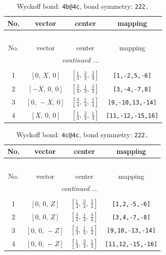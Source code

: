 \documentclass[fleqn,8pt]{jsarticle}
\begin{document}
\begin{longtable}{cccc}
\caption{Wyckoff bond: {\tt 4b@4c}, bond symmetry: {\tt 222.}}
 \\
 \hline \hline
No. & vector & center & mapping \\ \hline \endfirsthead

\multicolumn{3}{l}{\tablename\ \thetable{}} \\
 \hline \hline
No. & vector & center & mapping \\ \hline \endhead

 \hline \hline
\multicolumn{3}{r}{\footnotesize\it continued ...} \\ \endfoot

 \hline \hline
\multicolumn{3}{r}{} \\ \endlastfoot

1 & $\left[ 0,\, X,\, 0 \right]$ & $\left[ \frac{1}{4},\, \frac{3}{4},\, \frac{3}{4} \right]$ & {\tt [1,-2,5,-6]} \\ \hline
2 & $\left[ - X,\, 0,\, 0 \right]$ & $\left[ \frac{3}{4},\, \frac{1}{4},\, \frac{3}{4} \right]$ & {\tt [3,-4,-7,8]} \\ \hline
3 & $\left[ 0,\, - X,\, 0 \right]$ & $\left[ \frac{3}{4},\, \frac{1}{4},\, \frac{1}{4} \right]$ & {\tt [9,-10,13,-14]} \\ \hline
4 & $\left[ X,\, 0,\, 0 \right]$ & $\left[ \frac{1}{4},\, \frac{3}{4},\, \frac{1}{4} \right]$ & {\tt [11,-12,-15,16]} \\
\end{longtable}
\renewcommand{\arraystretch}{1.2}
\begin{longtable}{cccc}
\caption{Wyckoff bond: {\tt 4c@4c}, bond symmetry: {\tt 222.}}
 \\
 \hline \hline
No. & vector & center & mapping \\ \hline \endfirsthead

\multicolumn{3}{l}{\tablename\ \thetable{}} \\
 \hline \hline
No. & vector & center & mapping \\ \hline \endhead

 \hline \hline
\multicolumn{3}{r}{\footnotesize\it continued ...} \\ \endfoot

 \hline \hline
\multicolumn{3}{r}{} \\ \endlastfoot

1 & $\left[ 0,\, 0,\, Z \right]$ & $\left[ \frac{1}{4},\, \frac{3}{4},\, \frac{3}{4} \right]$ & {\tt [1,2,-5,-6]} \\ \hline
2 & $\left[ 0,\, 0,\, Z \right]$ & $\left[ \frac{3}{4},\, \frac{1}{4},\, \frac{3}{4} \right]$ & {\tt [3,4,-7,-8]} \\ \hline
3 & $\left[ 0,\, 0,\, - Z \right]$ & $\left[ \frac{3}{4},\, \frac{1}{4},\, \frac{1}{4} \right]$ & {\tt [9,10,-13,-14]} \\ \hline
4 & $\left[ 0,\, 0,\, - Z \right]$ & $\left[ \frac{1}{4},\, \frac{3}{4},\, \frac{1}{4} \right]$ & {\tt [11,12,-15,-16]} \\
\end{longtable}
\end{document}

